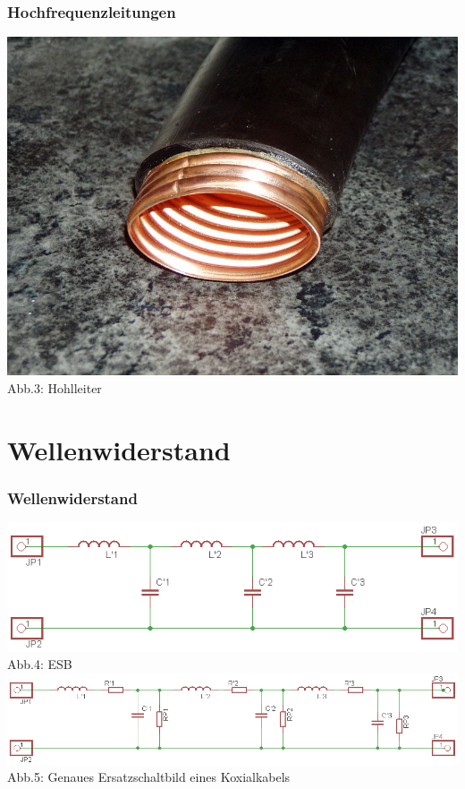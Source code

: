 \begin{frame}
\frametitle{Hochfrequenzleitungen}
\begin{center}
\includegraphics[scale=0.4]{a10/hohl.jpg}\\
Abb.3: Hohlleiter \cite{wp}
\end{center}
\end{frame}

\section*{Wellenwiderstand}
\begin{frame}
\frametitle{Wellenwiderstand}
\includegraphics[scale=0.8]{a10/wellenesb.png}\\
Abb.4: ESB 
\vspace{1cm}\\
\includegraphics[scale=0.65]{a10/wellenesbex.png}\\
Abb.5: Genaues Ersatzschaltbild eines Koxialkabels
\end{frame}

